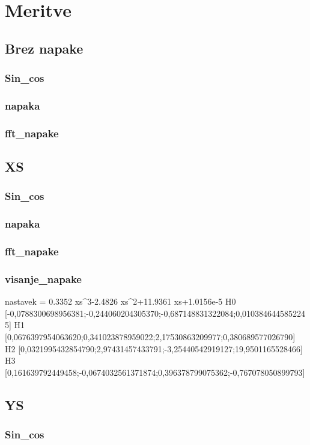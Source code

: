 \chapter{Meritve}
\section{Brez napake}
\subsection{Sin\_cos}
\subsection{napaka}
\subsection{fft\_napake}
\section{XS}
\subsection{Sin\_cos}
\subsection{napaka}
\subsection{fft\_napake}
\subsection{visanje\_napake}

nastavek = 0.3352 xs^3-2.4826 xs^2+11.9361 xs+1.0156e-5
H0	[-0,0788300698956381;-0,244060204305370;-0,687148831322084;0,0103846445852245]
H1	[0,0676397954063620;0,341023878959022;2,17530863209977;0,380689577026790]
H2	[0,0321995432854790;2,97431457433791;-3,25440542919127;19,9501165528466]
H3	[0,161639792449458;-0,0674032561371874;0,396378799075362;-0,767078050899793]



\section{YS}
\subsection{Sin\_cos}
